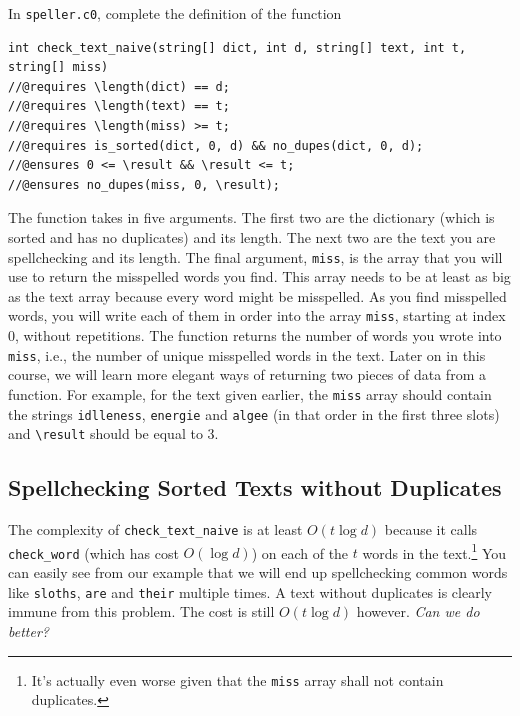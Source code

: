 \documentclass[12pt]{exam}
\begin{document}
\begin{task}[2]
In \lstinline'speller.c0', complete the definition of the function
\begin{lstlisting}[basicstyle=\smallbasicstyle]
int check_text_naive(string[] dict, int d, string[] text, int t, string[] miss)
//@requires \length(dict) == d;
//@requires \length(text) == t;
//@requires \length(miss) >= t;
//@requires is_sorted(dict, 0, d) && no_dupes(dict, 0, d);
//@ensures 0 <= \result && \result <= t;
//@ensures no_dupes(miss, 0, \result);
\end{lstlisting}
The function takes in five arguments. The first two are the dictionary
(which is sorted and has no duplicates) and its length. The next two
are the text you are spellchecking and its length. The final argument,
\lstinline'miss', is the array that you will use to return the
misspelled words you find. This array needs to be at least as big as
the text array because every word might be misspelled.  As you find
misspelled words, you will write each of them in order into the array
\lstinline'miss', starting at index 0, without repetitions.  The
function returns the number of words you wrote into \lstinline'miss',
i.e., the number of unique misspelled words in the text.  Later on in
this course, we will learn more elegant ways of returning two pieces
of data from a function.  For example, for the text given earlier, the
\lstinline'miss' array should contain the strings \lstinline'idlleness',
\lstinline'energie' and \lstinline'algee' (in that order in the
first three slots) and \lstinline'\result' should be equal to 3.
\end{task}


\subsection{Spellchecking Sorted Texts without Duplicates}

The complexity of \lstinline'check_text_naive' is at least $O(t \log
d)$ because it calls \lstinline'check_word' (which has cost $O(\log
d)$) on each of the $t$ words in the text.\footnote{It's actually even
  worse given that the \lstinline[basicstyle=\smallerbasicstyle]'miss' array shall not contain
  duplicates.}  You can easily see from our example that we will end
up spellchecking common words like \lstinline'sloths', \lstinline'are'
and \lstinline'their' multiple times.  A text without duplicates is
clearly immune from this problem.  The cost is still $O(t \log d)$
however.  \emph{Can we do better?}
\end{document}
